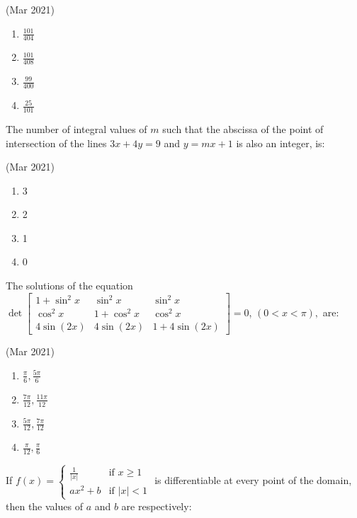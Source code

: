 			\hfill{(Mar 2021)}
			\begin{multicols}{4}
                \begin{enumerate}
    \item $\frac{101}{404}$
    \item $\frac{101}{408}$
    \item $\frac{99}{400}$
    \item $\frac{25}{101}$
                \end{enumerate}
			\end{multicols}
	\item
		The number of integral values of $m$ such that the abscissa of the point of intersection of the lines $3x + 4y = 9$ and $y = mx + 1$ is also an integer, is:

			\hfill{(Mar 2021)}
			\begin{multicols}{4}
                \begin{enumerate}
    \item 3
    \item 2
    \item 1
    \item 0
                \end{enumerate}
			\end{multicols}
	\item
		The solutions of the equation $ \det\begin{bmatrix}
1 + \sin^2 x & \sin^2 x & \sin^2 x \\
\cos^2 x & 1 + \cos^2 x & \cos^2 x \\
4\sin(2x) & 4\sin(2x) & 1 + 4\sin(2x)
		\end{bmatrix} = 0 $, $(0 < x < \pi),$ are:

			\hfill{(Mar 2021)}
			\begin{multicols}{2}
		\begin{enumerate}
    \item $ \frac{\pi}{6}, \frac{5\pi}{6} $
    \item $ \frac{7\pi}{12}, \frac{11\pi}{12} $
    \item $ \frac{5\pi}{12}, \frac{7\pi}{12} $
    \item $ \frac{\pi}{12}, \frac{\pi}{6} $
                \end{enumerate}
			\end{multicols}
	\item
			If $f(x) = \begin{cases} \frac{1}{|x|} & \text{if } x \geq 1 \\ ax^2 + b & \text{if } |x| < 1 \end{cases}$ is differentiable at every point of the domain, then the values of $a$ and $b$ are respectively:

